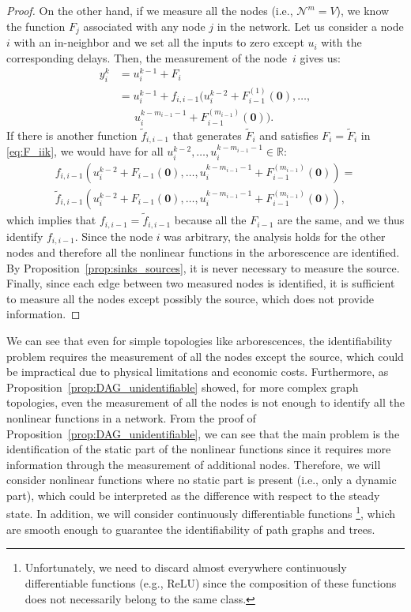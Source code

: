 \documentclass[letterpaper,10pt,journal]{IEEEtran}
\newcommand{\R}{\mathbb R}
\newcommand{\NN}{\mathcal{N}}
\newcommand{\zero}{\mathbf{0}}
\begin{document}
\begin{proof}
\noindent On the other hand, if we measure all the nodes (i.e., $\NN^m=V$), we know the function $F_j$ associated with any node $j$ in the network. Let us consider a node $i$ with an in-neighbor and we set all the inputs to zero except $u_i$ with the corresponding delays. Then, the measurement of the node~$i$ gives us:
\begin{align}
    y_i^k&=u_i^{k-1}+F_i\label{eq:F_iik}\\
    &=u_i^{k-1}+f_{i,i-1}(u_i^{k-2}+F_{i-1}^{(1)}(\zero),\ldots,\nonumber\\
    &\quad\:\: u_i^{k-m_{i-1}-1}+F_{i-1}^{(m_{i-1})}(\zero)).\nonumber
\end{align}
If there is another function $\tilde f_{i,i-1}$ that generates $\tilde F_i$ and satisfies $F_i=\tilde F_i$ in \eqref{eq:F_iik}, we would have for all $u_i^{k-2},\ldots,u_i^{k-m_{i-1}-1}\in\R$:
\begin{multline*}
f_{i,i-1}(u_i^{k-2}+F_{i-1}(\zero),\ldots,u_i^{k-m_{i-1}-1}+F_{i-1}^{(m_{i-1})}(\zero))=\\
\tilde f_{i,i-1}(u_i^{k-2}+F_{i-1}(\zero),\ldots,u_i^{k-m_{i-1}-1}+F_{i-1}^{(m_{i-1})}(\zero)),    
\end{multline*}
which implies that $f_{i,i-1}=\tilde f_{i,i-1}$ because all the $F_{i-1}$ are the same, and we thus identify $f_{i,i-1}$. Since the node $i$ was arbitrary, the analysis holds for the other nodes and therefore all the nonlinear functions in the arborescence are identified.
By Proposition~\ref{prop:sinks_sources}, it is never necessary to measure the source. Finally, since each edge between two measured nodes is identified, it is sufficient to measure all the nodes except possibly the source, which does not provide information.
\end{proof}


We can see that even for simple topologies like arborescences, the identifiability problem requires the measurement of all the nodes except the source, which could be impractical due to physical limitations and economic costs.
Furthermore, as Proposition~\ref{prop:DAG_unidentifiable} showed, for more complex graph topologies, even the measurement of all the nodes is not enough to identify all the nonlinear functions in a network. From the proof of Proposition~\ref{prop:DAG_unidentifiable}, we can see that the main problem is the identification of the static part of the nonlinear functions since it requires more information through the measurement of additional nodes.
Therefore, we will consider nonlinear functions where no static part is present (i.e., only a dynamic part), which could be interpreted as the difference with respect to the steady state. In addition, we will consider continuously differentiable functions \footnote{Unfortunately, we need to discard almost everywhere continuously differentiable functions (e.g., ReLU) since the composition of these functions does not necessarily belong to the same class.}, which are smooth enough to guarantee the identifiability of path graphs and trees. 
\end{document}
